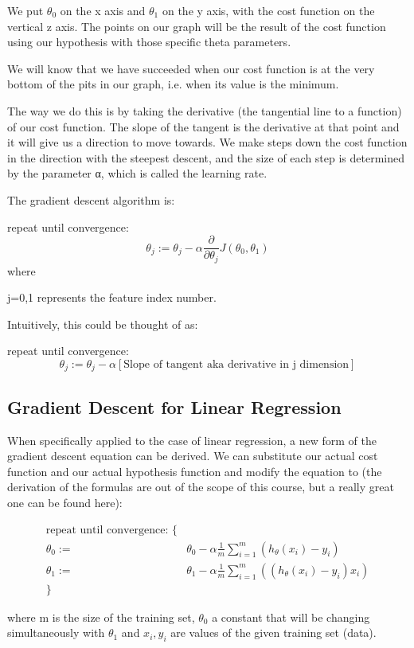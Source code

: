 \documentclass{article}
\begin{document}
We put $\theta_0$ on the x axis and $\theta_1$ on the y axis, with the cost function on the vertical z axis. The points on our graph will be the result of the cost function using our hypothesis with those specific theta parameters.

We will know that we have succeeded when our cost function is at the very bottom of the pits in our graph, i.e. when its value is the minimum.

The way we do this is by taking the derivative (the tangential line to a function) of our cost function. The slope of the tangent is the derivative at that point and it will give us a direction to move towards. We make steps down the cost function in the direction with the steepest descent, and the size of each step is determined by the parameter α, which is called the learning rate.

The gradient descent algorithm is:

repeat until convergence:
$$\theta_j := \theta_j - \alpha \frac{\partial}{\partial \theta_j} J(\theta_0, \theta_1)$$
where

j=0,1 represents the feature index number.

Intuitively, this could be thought of as:

repeat until convergence:
$$\theta_j := \theta_j - \alpha [\text{Slope of tangent aka derivative in j dimension}]$$
\subsection{Gradient Descent for Linear Regression}
When specifically applied to the case of linear regression, a new form of the gradient descent equation can be derived. We can substitute our actual cost function and our actual hypothesis function and modify the equation to (the derivation of the formulas are out of the scope of this course, but a really great one can be found here):

\begin{align*}
  \text{repeat until convergence: } \lbrace & \\
  \theta_0 := & \theta_0 - \alpha \frac{1}{m} \sum\limits_{i=1}^{m}(h_\theta(x_{i}) - y_{i}) \\
  \theta_1 := & \theta_1 - \alpha \frac{1}{m} \sum\limits_{i=1}^{m}\left((h_\theta(x_{i}) - y_{i}) x_{i}\right) \\
  \rbrace&
  \end{align*}

where m is the size of the training set, $\theta_0$ a constant that will be changing simultaneously with $\theta_1$ and $x_{i}, y_{i}$ are values of the given training set (data).
\end{document}
